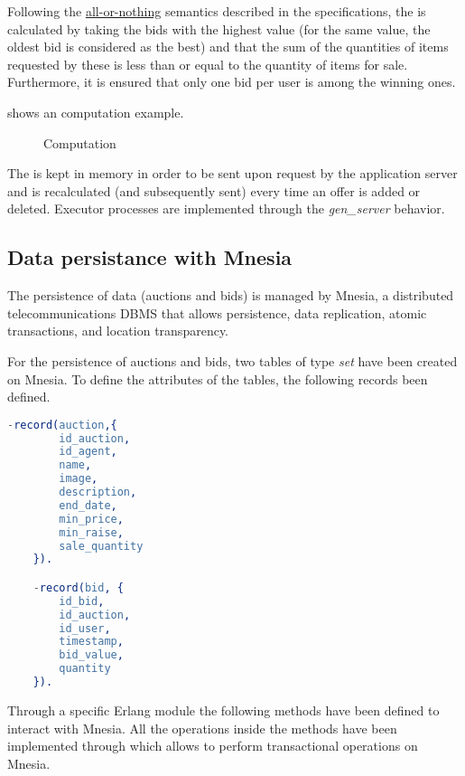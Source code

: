 Following the \underline{all-or-nothing} semantics described in the
specifications, the  is calculated by taking the bids with
the highest value (for the same value, the oldest bid is considered as the best)
and that the sum of the quantities of items requested by these is less than or
equal to the quantity of items for sale. Furthermore, it is ensured that only
one bid per user is among the winning ones.

 shows an  computation
example.


\begin{figure}[htb]
	\centering
	\caption{
	Computation}\label{fig:auction-state-example}
\end{figure}

The  is kept in memory in order to be sent upon request by
the application server and is recalculated (and subsequently sent) every time an
offer is added or deleted. Executor processes are implemented through the
\textit{gen\_server} behavior.

\subsection{Data persistance with Mnesia}

The persistence of data (auctions and bids) is managed by Mnesia, a distributed
telecommunications DBMS that allows persistence, data replication, atomic
transactions, and location transparency.

For the persistence of auctions and bids, two tables of type \textit{set} have
been created on Mnesia. To define the attributes of the tables, the following
records been defined.

\begin{lstlisting}[language=Erlang, caption=Mnesia Record]
    -record(auction,{
        id_auction,
        id_agent,
        name,
        image,
        description,
        end_date,
        min_price,
        min_raise,
        sale_quantity
    }).

    -record(bid, {
        id_bid,
        id_auction,
        id_user,
        timestamp,
        bid_value,
        quantity
    }).
\end{lstlisting}

Through a specific Erlang module the following methods have been defined to
interact with Mnesia. All the operations inside the methods have been
implemented through  which allows to perform
transactional operations on Mnesia.

